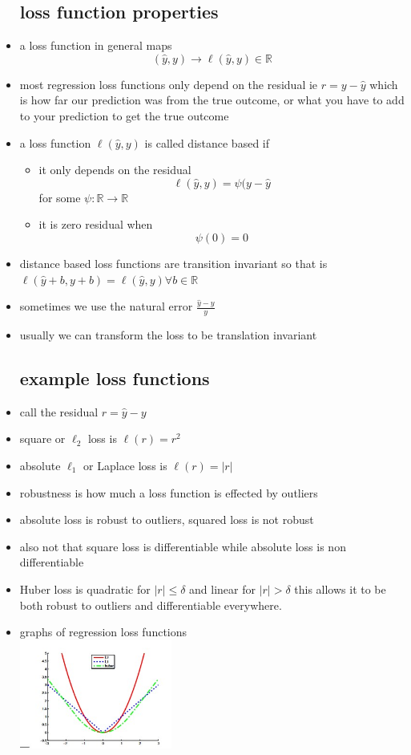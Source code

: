 \documentclass{article}
\begin{document}
\begin{itemize}
\subsection{loss function properties}
\item a loss function in general maps $$(\hat{y},y)\rightarrow \ell(\hat{y},y)\in \mathbb{R}$$
\item most regression loss functions only depend on the residual ie $r=y-\hat{y}$ which is how far our prediction was from the true outcome, or what you have to add to your prediction to get the true outcome
\item a loss function $\ell(\hat{y},y)$ is called distance based if 
\begin{itemize}
    \item it only depends on the residual $$\ell(\hat{y},y)=\psi(y-\hat{y}$$ for some $\psi: \mathbb{R}\rightarrow \mathbb{R}$
    \item it is zero residual when $$\psi(0)=0$$
\end{itemize}
\item distance based loss functions are transition invariant so that is $\ell(\hat{y}+b,y+b)=\ell(\hat{y},y)\forall b\in \mathbb{R}$
\item sometimes we use the natural error $\frac{\hat{y}-y}{y}$
\item usually we can transform the loss to be translation invariant 
\subsection{example loss functions}
\item call the residual $r=\hat{y}-y$
\item square or $\ell_{2}$ loss is $\ell(r)=r^2$
\item absolute $\ell_{1}$ or Laplace loss is $\ell(r)=|r|$
\item robustness is how much a loss function is effected by outliers 
\item absolute loss is robust to outliers, squared loss is not robust
\item also not that square loss is differentiable while absolute loss is non differentiable 
\item Huber loss is quadratic for $|r|\leq  \delta$ and linear for $|r|> \delta$ this allows it to be both robust to outliers and differentiable everywhere. 
\item graphs of regression loss functions\\
 \includegraphics[width=5cm]{lecture_notes/lecture_2/immages/g_d_6.jpg}

\end{itemize}
\end{document}
